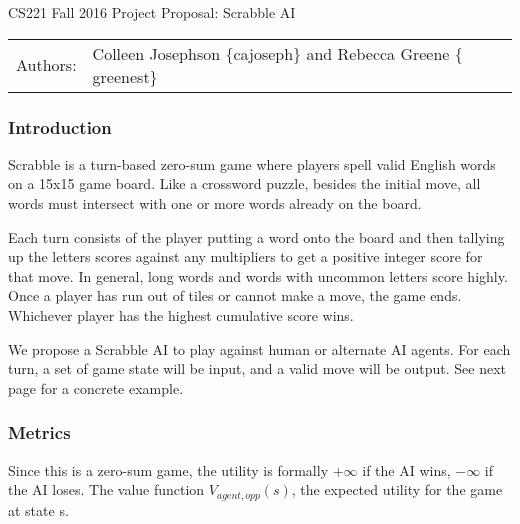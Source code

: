 \documentclass[12pt]{article}
\begin{document}
\begin{center}
{\Large CS221 Fall 2016 Project Proposal: Scrabble AI}

\begin{tabular}{rl}
  Authors: & Colleen Josephson $\{$cajoseph$\}$ and Rebecca Greene $\{$greenest$\}$\\
\end{tabular}
\end{center}

\subsubsection*{Introduction}
Scrabble is a turn-based zero-sum game where players spell valid
English words on a 15x15 game board. Like a crossword puzzle, besides
the initial move, all words must intersect with one or more words
already on the board.

Each turn consists of the player putting a word onto the board and
then tallying up the letters scores against any multipliers to get a
positive integer score for that move. In general, long words and words
with uncommon letters score highly. Once a player has run out of tiles
or cannot make a move, the game ends. Whichever player has the highest
cumulative score wins.

We propose a Scrabble AI to play against human or alternate AI
agents. For each turn, a set of game state will be input, and a valid
move will be output. See next page for a concrete example. 





\subsubsection*{Metrics}
Since this is a zero-sum game, the utility is formally $+\infty$ if
the AI wins, $-\infty$ if the AI loses. The value function
$V_{agent,opp}(s)$, the expected utility for the game at state s.
\end{document}
